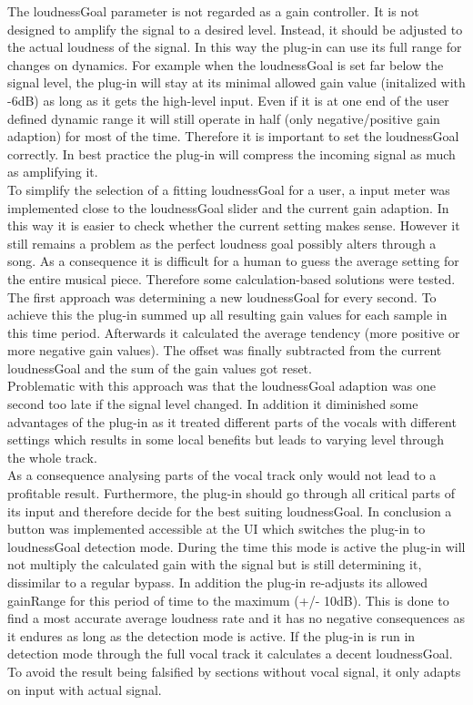 The loudnessGoal parameter is not regarded as a gain controller. It is not designed to amplify the signal to a desired level. Instead, it should be adjusted to the actual loudness of the signal. In this way the plug-in can use its full range for changes on dynamics. For example when the loudnessGoal is set far below the signal level, the plug-in will stay at its minimal allowed gain value (initalized with -6dB) as long as it gets the high-level input. Even if it is at one end of the user defined dynamic range it will still operate in half (only negative/positive gain adaption) for most of the time. Therefore it is important to set the loudnessGoal correctly. In best practice the plug-in will compress the incoming signal as much as amplifying it.\\
To simplify the selection of a fitting loudnessGoal for a user, a input meter was implemented close to the loudnessGoal slider and the current gain adaption. In this way it is easier to check whether the current setting makes sense. However it still remains a problem as the perfect loudness goal possibly alters through a song. As a consequence it is difficult for a human to guess the average setting for the entire musical piece. Therefore some calculation-based solutions were tested.\\
The first approach was determining a new loudnessGoal for every second. To achieve this the plug-in summed up all resulting gain values for each sample in this time period. Afterwards it calculated the average tendency (more positive or more negative gain values). The offset was finally subtracted from the current loudnessGoal and the sum of the gain values got reset.\\
Problematic with this approach was that the loudnessGoal adaption was one second too late if the signal level changed. In addition it diminished some advantages of the plug-in as it treated different parts of the vocals with different settings which results in some local benefits but leads to varying level through the whole track.\\
As a consequence analysing parts of the vocal track only would not lead to a profitable result. Furthermore, the plug-in should go through all critical parts of its input and therefore decide for the best suiting loudnessGoal. In conclusion a button was implemented accessible at the UI which switches the plug-in to loudnessGoal detection mode. During the time this mode is active the plug-in will not multiply the calculated gain with the signal but is still determining it, dissimilar to a regular bypass. In addition the plug-in re-adjusts its allowed gainRange for this period of time to the maximum (+/- 10dB). This is done to find a most accurate average loudness rate and it has no negative consequences as it endures as long as the detection mode is active. If the plug-in is run in detection mode through the full vocal track it calculates a decent loudnessGoal. To avoid the result being falsified by sections without vocal signal, it only adapts on input with actual signal.\\
